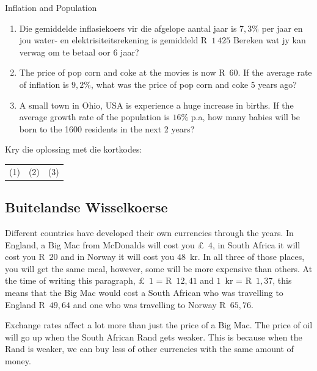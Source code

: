 \begin{exercises}{Inflation and Population}
    \begin{enumerate}[label=\textbf{\arabic*}.]
	\item Die gemiddelde inflasiekoers vir die afgelope aantal jaar is $7,3\%$ per jaar en jou water- en elektrisiteitsrekening is gemiddeld R~$1~425$ Bereken wat jy kan verwag om te betaal oor 6 jaar?

	\item The price of pop corn and coke at the movies is now R~$60$. If the average rate of inflation is $9,2\%$, what was the price of pop corn and coke 5 years ago?

	\item A small town in Ohio, USA is experience a huge increase in births. If the average growth rate of the population is $16\%$ p.a, how many babies will be born to the 1600 residents in the next 2 years?\\
    \end{enumerate}

    Kry die oplossing met die kortkodes:\\
    \begin{tabularx}{\textwidth}{ XXX }
	(1)	&	(2)	&	(3)\\
    \end{tabularx}
\end{exercises}



\subsection{Buitelandse Wisselkoerse}

Different countries have developed their own currencies through the years. In England, a Big Mac from McDonalds will cost you £~$4$, in South Africa it will cost you R~$20$ and in Norway it will cost you $48$~kr. In all three of those places, you will get the same meal, however, some will be more expensive than others. At the time of writing this paragraph, £~$1$ = R~$12,41$ and $1$~kr = R~$1,37$, this means that the Big Mac would cost a South African who was travelling to England R~$49,64$ and one who was travelling to Norway R~$65,76$.\par

Exchange rates affect a lot more than just the price of a Big Mac. The price of oil will go up when the South African Rand gets weaker. This is because when the Rand is weaker, we can buy less of other currencies with the same amount of money.\par

